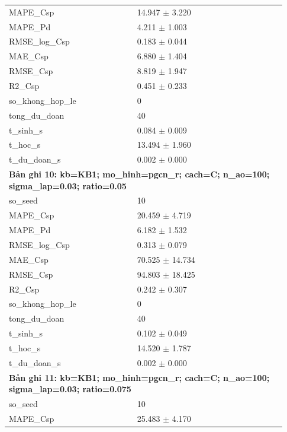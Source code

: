 \begin{longtable}{p{0.43\linewidth}p{0.50\linewidth}}
MAPE\_\allowbreak Csp & 14.947 $\pm$ 3.220 \\
MAPE\_\allowbreak Pd & 4.211 $\pm$ 1.003 \\
RMSE\_\allowbreak log\_\allowbreak Csp & 0.183 $\pm$ 0.044 \\
MAE\_\allowbreak Csp & 6.880 $\pm$ 1.404 \\
RMSE\_\allowbreak Csp & 8.819 $\pm$ 1.947 \\
R2\_\allowbreak Csp & 0.451 $\pm$ 0.233 \\
so\_\allowbreak khong\_\allowbreak hop\_\allowbreak le & 0 \\
tong\_\allowbreak du\_\allowbreak doan & 40 \\
t\_\allowbreak sinh\_\allowbreak s & 0.084 $\pm$ 0.009 \\
t\_\allowbreak hoc\_\allowbreak s & 13.494 $\pm$ 1.960 \\
t\_\allowbreak du\_\allowbreak doan\_\allowbreak s & 0.002 $\pm$ 0.000 \\
\midrule
\multicolumn{2}{p{0.95\linewidth}}{\textbf{Bản ghi 10: kb=KB1; mo\_hinh=pgcn\_r; cach=C; n\_ao=100; sigma\_lap=0.03; ratio=0.05}} \\
so\_\allowbreak seed & 10 \\
MAPE\_\allowbreak Csp & 20.459 $\pm$ 4.719 \\
MAPE\_\allowbreak Pd & 6.182 $\pm$ 1.532 \\
RMSE\_\allowbreak log\_\allowbreak Csp & 0.313 $\pm$ 0.079 \\
MAE\_\allowbreak Csp & 70.525 $\pm$ 14.734 \\
RMSE\_\allowbreak Csp & 94.803 $\pm$ 18.425 \\
R2\_\allowbreak Csp & 0.242 $\pm$ 0.307 \\
so\_\allowbreak khong\_\allowbreak hop\_\allowbreak le & 0 \\
tong\_\allowbreak du\_\allowbreak doan & 40 \\
t\_\allowbreak sinh\_\allowbreak s & 0.102 $\pm$ 0.049 \\
t\_\allowbreak hoc\_\allowbreak s & 14.520 $\pm$ 1.787 \\
t\_\allowbreak du\_\allowbreak doan\_\allowbreak s & 0.002 $\pm$ 0.000 \\
\midrule
\multicolumn{2}{p{0.95\linewidth}}{\textbf{Bản ghi 11: kb=KB1; mo\_hinh=pgcn\_r; cach=C; n\_ao=100; sigma\_lap=0.03; ratio=0.075}} \\
so\_\allowbreak seed & 10 \\
MAPE\_\allowbreak Csp & 25.483 $\pm$ 4.170 \\

\end{longtable}
